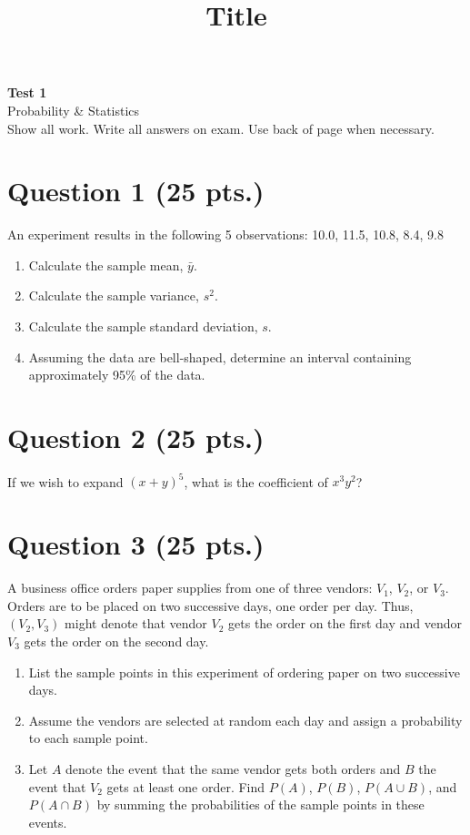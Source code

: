 \documentclass[11pt]{article}
\theoremstyle{definition}
\begin{document}
\title{Title}

\thispagestyle{empty}

\begin{center}
{\LARGE \bf Test 1} \\
{\large Probability \& Statistics} \\
{\large Show all work. Write all answers on exam. Use back of page when necessary. } \\
\end{center}
\section*{Question 1 (25 pts.)}

An experiment results in the following 5 observations: 10.0, 11.5, 10.8,  8.4,  9.8

\begin{enumerate}
	\item Calculate the sample mean, $\bar{y}$.
	\item Calculate the sample variance, $s^2$.
	\item Calculate the sample standard deviation, $s$.
	\item Assuming the data are bell-shaped, determine an interval containing approximately 95\% of the data.
\end{enumerate}

\newpage

\section*{Question 2 (25 pts.)}

If we wish to expand $(x + y)^5$, what is the coefficient of $x^3y^2$?

\newpage

\section*{Question 3 (25 pts.)}

A business office orders paper supplies from one of three vendors: $V_1$, $V_2$, or $V_3$. Orders are to be placed on two successive days, one order per day. Thus, $(V_2, V_3)$ might denote that vendor $V_2$ gets the order on the first day and vendor $V_3$ gets the order on the second day.

\begin{enumerate}
	\item List the sample points in this experiment of ordering paper on two successive days.
	\item Assume the vendors are selected at random each day and assign a probability to each sample point.
	\item Let $A$ denote the event that the same vendor gets both orders and $B$ the event that $V_2$ gets at least one order. Find $P(A)$, $P(B)$, $P(A \cup B)$, and $P(A \cap B)$ by summing the probabilities of the sample points in these events.
\end{enumerate}
\end{document}
